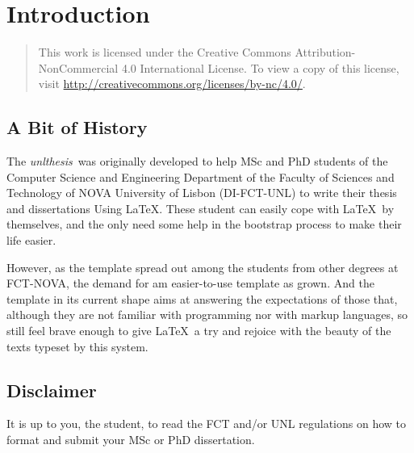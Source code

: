 \newcommand{\unlthesis}{\emph{unlthesis}}
\newcommand{\unlthesisclass}{\texttt{unlthesis.cls}}


\chapter{Introduction}
\label{cha:introduction}

\begin{quote}
  This work is licensed under the Creative Commons Attribution-NonCommercial 4.0 International License.
  To view a copy of this license, visit \url{http://creativecommons.org/licenses/by-nc/4.0/}.
\end{quote}

\section{A Bit of History} %
\label{sec:a_bit_of_history}

The \unlthesis\ was originally developed to help MSc and PhD students of the Computer Science and Engineering Department of the Faculty of Sciences and Technology of NOVA University of Lisbon (DI-FCT-UNL) to write their thesis and dissertations Using \LaTeX.
%
These student can easily cope with \LaTeX\ by themselves, and the only need some help in the bootstrap process to make their life easier.

However, as the template spread out among the students from other degrees at FCT-NOVA, the demand for am easier-to-use template as grown.
%
And the template in its current shape aims at answering the expectations of those that, although they are not familiar with programming nor with markup languages, so still feel brave enough to give \LaTeX\ a try and rejoice with the beauty of the texts typeset by this system.



\section{Disclaimer} %
\label{sec:disclaimer}

It is up to you, the student, to read the FCT and/or UNL regulations on how to format and submit your MSc or PhD dissertation.  

